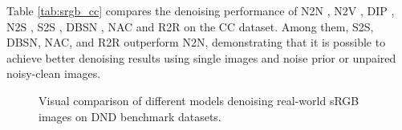 \documentclass[conference]{IEEEtran}
\begin{document}
Table \ref{tab:srgb_cc} compares the denoising performance of N2N \cite{lehtinen2018noise2noise}, N2V \cite{krull2019noise2void}, DIP \cite{ulyanov2018deep}, N2S \cite{batson2019noise2self}, S2S \cite{quan2020self2self}, DBSN \cite{wu2020unpaired}, NAC \cite{xu2020noisy} and R2R \cite{pang2021recorrupted} on the CC \cite{nam2016holistic} dataset. Among them, S2S, DBSN, NAC, and R2R outperform N2N, demonstrating that it is possible to achieve better denoising results using single images and noise prior or unpaired noisy-clean images.

\begin{figure}[t]
	\setlength{\abovecaptionskip}{0cm}
	\setlength{\belowcaptionskip}{0cm}
	\centering
	\begin{minipage}[b]{0.52\linewidth}
		\setlength{\abovecaptionskip}{1pt}
	\end{minipage}
	\begin{minipage}[b]{0.21\linewidth}
		\setlength{\abovecaptionskip}{1pt}
		\centering
		\addtocounter{subfigure}{-1}
		\quad
	\end{minipage}
	\begin{minipage}[b]{0.21\linewidth}
		\setlength{\abovecaptionskip}{1pt}
		\centering
		\quad
	\end{minipage}
	\setlength{\belowcaptionskip}{-0.5cm}
	\caption{Visual comparison of different models denoising real-world sRGB images on DND \cite{plotz2017benchmarking} benchmark datasets. }
	\label{fig:figure 11}
\vspace{-1.5em}
\end{figure}
\end{document}
